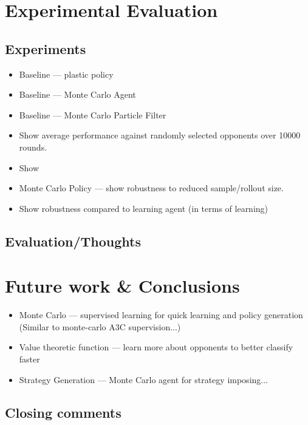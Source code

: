 \section{Experimental Evaluation}


\subsection{Experiments}
\begin{itemize}
    \item Baseline --- plastic policy
    \item Baseline --- Monte Carlo Agent
    \item Baseline --- Monte Carlo Particle Filter
    \item Show average performance against randomly selected opponents over 10000 rounds. 
    \item Show 
    \item Monte Carlo Policy --- show robustness to reduced sample/rollout size. 
    \item Show robustness compared to learning agent (in terms of learning)
\end{itemize}
\subsection{Evaluation/Thoughts}
\section{Future work \& Conclusions}
\begin{itemize}
    \item Monte Carlo --- supervised learning for quick learning and policy generation (Similar to monte-carlo A3C supervision...)
    \item Value theoretic function --- learn more about opponents to better classify faster
    \item Strategy Generation --- Monte Carlo agent for strategy imposing... 
\end{itemize}
\subsection{Closing comments}